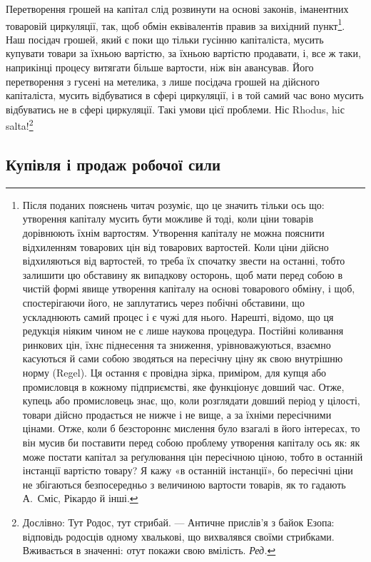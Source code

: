 Перетворення грошей на капітал слід розвинути на основі
законів, іманентних товаровій циркуляції, так, щоб обмін еквівалентів
правив за вихідний пункт\footnote{
Після поданих пояснень читач розуміє, що це значить тільки ось
що: утворення капіталу мусить бути можливе й тоді, коли ціни товарів
дорівнюють їхнім вартостям. Утворення капіталу не можна пояснити відхиленням
товарових цін від товарових вартостей. Коли ціни дійсно
відхиляються від вартостей, то треба їх спочатку звести на останні, тобто
залишити цю обставину як випадкову осторонь, щоб мати перед собою в
чистій формі явище утворення капіталу на основі товарового обміну, і
щоб, спостерігаючи його, не заплутатись через побічні обставини, що
ускладнюють самий процес і є чужі для нього. Нарешті, відомо, що ця
редукція ніяким чином не є лише наукова процедура. Постійні коливання
ринкових цін, їхнє піднесення та зниження, урівноважуються,
взаємно
касуються й сами собою зводяться на пересічну ціну як свою внутрішню
норму (Regel). Ця остання є провідна зірка, приміром, для купця або
промисловця в кожному підприємстві, яке функціонує довший час. Отже,
купець або промисловець знає, що, коли розглядати довший період у
цілості, товари дійсно продається не нижче і не вище, а за їхніми пересічними
цінами. Отже, коли б безстороннє мислення було взагалі в його інтересах,
то він мусив би поставити перед собою проблему утворення капіталу
ось як: як може постати капітал за реґулювання цін пересічною ціною,
тобто в останній інстанції вартістю товару? Я кажу «в останній інстанції»,
бо пересічні ціни не збігаються безпосередньо з величиною вартости товарів,
як то гадають А.~Сміс, Рікардо й інші.
}. Наш посідач грошей, який
є поки що тільки гусінню капіталіста, мусить купувати товари
за їхньою вартістю, за їхньою вартістю продавати, і, все ж таки,
наприкінці процесу витягати більше вартости, ніж він авансував.
Його перетворення з гусені на метелика, з лише посідача
грошей на дійсного капіталіста, мусить відбуватися в сфері
циркуляції, і в той самий час воно мусить відбуватись не
в сфері циркуляції. Такі умови цієї проблеми. Ніс Rhodus,
hiс salta!\footnote*{
Дослівно: Тут Родос, тут стрибай. — Античне прислів’я з байок
Езопа: відповідь родосців одному хвалькові, що вихвалявся своїми
стрибками. Вживається в значенні: отут покажи свою вмілість. \emph{Ред.}
}

\subsection{Купівля і продаж робочої сили}

